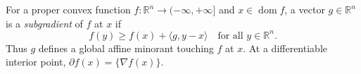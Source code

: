 
For a proper convex function $f:\mathbb R^n\to(-\infty,+\infty]$ and $x\in\operatorname{dom}f$, a vector $g\in\mathbb R^n$ is a \emph{subgradient} of $f$ at $x$ if
\[
f(y)\ge f(x)+\langle g,y-x\rangle\quad\text{for all }y\in\mathbb R^n.
\]
Thus $g$ defines a global affine minorant touching $f$ at $x$. At a differentiable interior point, $\partial f(x)=\{\nabla f(x)\}$.

